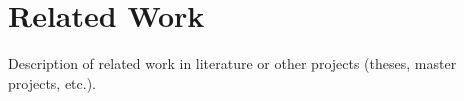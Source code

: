 \section{Related Work}
\label{sec:related-work}

Description of related work in literature or other projects (theses, master projects, etc.).
\cite{MPSM}
\cite{Balkesen}
\cite{10.14778/1687553.1687564}
\cite{10.14778/1454159.1454171}

